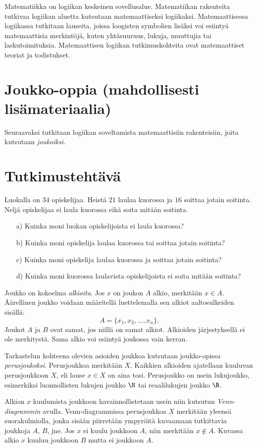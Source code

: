 Matematiikka on logiikan keskeinen sovellusalue. Matematiikan rakenteita tutkivaa logiikan aluetta kutsutaan matemaattiseksi logiikaksi. Matemaattisessa logiikassa tutkitaan lauseita, joissa loogisten symbolien lisäksi voi esiintyä matemaattisia merkintöjä, kuten yhtäsuuruus, lukuja, muuttujia tai laskutoimituksia. Matemaattisen logiikan tutkimuskohteita ovat matemaattiset teoriat ja todistukset.


\section{Joukko-oppia (mahdollisesti lisämateriaalia)}
Seuraavaksi tutkitaan logiikan soveltamista matemaattisiin rakenteisiin, joita kutsutaan {\em joukoiksi}.

\section*{Tutkimustehtävä}
Luokalla on $34$ opiskelijaa. Heistä $21$ laulaa kuorossa ja $16$ soittaa jotain soitinta. Neljä opiskelijaa ei laula kuorossa eikä soita mitään soitinta.
\begin{itemize}
\item[a)] Kuinka moni luokan opiskelijoista ei laula kuorossa?
\item[b)] Kuinka moni opiskelija laulaa kuorossa tai soittaa jotain soitinta?
\item[c)] Kuinka moni opiskelija laulaa kuorossa ja soittaa jotain soitinta?
\item[d)] Kuinka moni kuorossa laulavista opiskelijoista ei soita mitään soitinta?
\end{itemize}

Joukko on kokoelma {\em alkioita}. Jos $x$ on joukon $A$ alkio, merkitään $x\in A$. Äärellinen joukko voidaan määritellä luettelemalla sen alkiot aaltosulkeiden sisällä:
\[
 A = \{ x_1,x_2,\ldots,x_n\}.
\]
Joukot $A$ ja $B$ ovat samat, jos niillä on samat alkiot. Alkioiden jär\-jes\-tyk\-sel\-lä ei ole merkitystä. Sama alkio voi esiintyä joukossa vain kerran.

Tarkastelun kohteena olevien asioiden joukkoa kutsutaan joukko-opissa {\em perusjoukoksi}. Perusjoukkoa merkitään $X$. Kaikkien alkioiden ajatellaan kuuluvan perusjoukkoon $X$, eli lause $x\in X$ on aina tosi. Perusjoukko on usein lukujoukko, esimerkiksi luonnollisten lukujen joukko $\N$ tai reaalilukujen joukko $\R$.

Alkion $x$ kuulumista joukkoon havainnollistetaan usein niin kutsutun {\em Venn-diagrammin} avulla. Venn-diagrammissa perusjoukkoa $X$ merkitään yleensä suorakulmiolla, jonka sisään piirretään ympyröitä  kuvaamaan tutkittavia joukkoja $A$, $B$, jne. Jos $x$ ei kuulu joukkoon $A$, niin merkitään $x \notin A$. Kuvassa alkio $x$ kuuluu joukkoon $B$ mutta ei joukkoon $A$.

